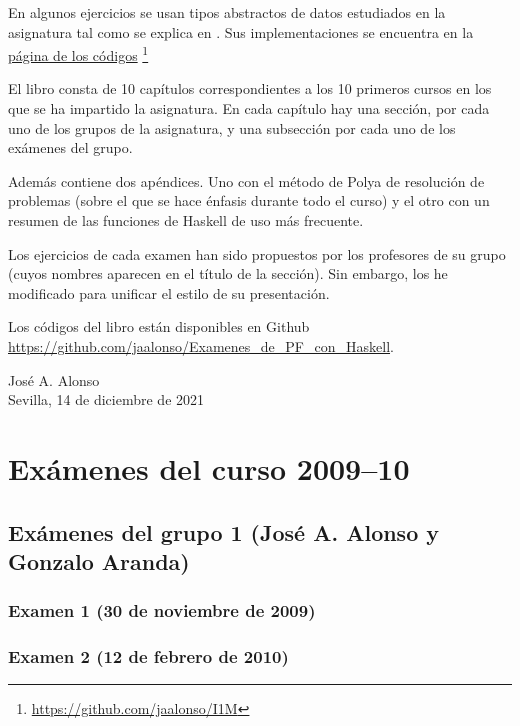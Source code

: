 \documentclass[a4paper,12pt,twoside]{book}
\begin{document}
En algunos ejercicios se usan tipos abstractos de datos estudiados en la
asignatura tal como se explica en \cite{Alonso-12a}. Sus implementaciones se
encuentra en la
\href{https://github.com/jaalonso/I1M}
     {página de los códigos}
     \footnote{\url{https://github.com/jaalonso/I1M}}

El libro consta de 10 capítulos correspondientes a los 10 primeros
cursos en los que se ha impartido la asignatura. En cada capítulo
hay una sección, por cada uno de los grupos de la asignatura, y una
subsección por cada uno de los exámenes del grupo.

Además contiene dos apéndices. Uno con el método de Polya de resolución de
problemas (sobre el que se hace énfasis durante todo el curso) y el otro con un
resumen de las funciones de Haskell de uso más frecuente.

Los ejercicios de cada examen han sido propuestos por los profesores de su
grupo (cuyos nombres aparecen en el título de la sección). Sin embargo, los he
modificado para unificar el estilo de su presentación.

Los códigos del libro están disponibles en Github
\href{https://github.com/jaalonso/Examenes_de_PF_con_Haskell}
     {\url{https://github.com/jaalonso/Examenes_de_PF_con_Haskell}}.

\begin{flushright}
  José A. Alonso \\
  Sevilla, 14 de diciembre de 2021
\end{flushright}

\chapter{Exámenes del curso 2009--10}

\section{Exámenes del grupo 1 (José A. Alonso y Gonzalo Aranda)}
\subsection{Examen 1 (30 de noviembre de 2009)}
\subsection{Examen 2 (12 de febrero de 2010)}
\end{document}
